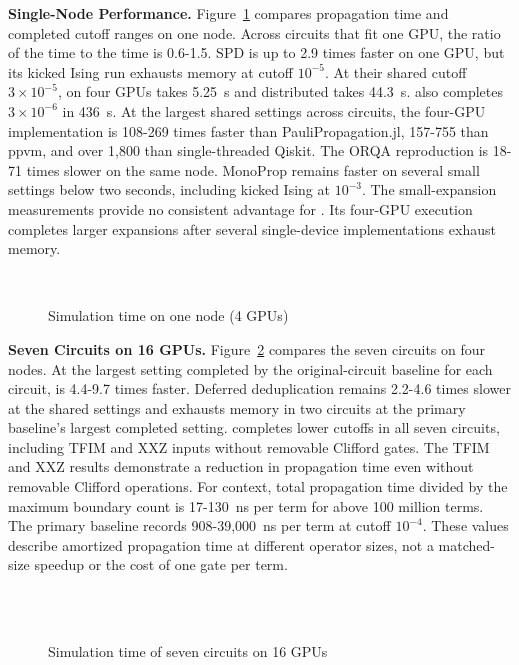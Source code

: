 \noindent\textbf{Single-Node Performance.}
Figure~\ref{fig:single} compares propagation time and completed cutoff ranges on one node.
Across circuits that fit one GPU, the ratio of the \cuPP time to the \SectorQ time is 0.6-1.5.
SPD is up to 2.9 times faster on one GPU, but its kicked Ising run exhausts memory at cutoff $10^{-5}$.
At their shared cutoff $3\times10^{-5}$, \SectorQ on four GPUs takes 5.25~s and distributed \cuPP takes 44.3~s.
\SectorQ also completes $3\times10^{-6}$ in 436~s.
At the largest shared settings across circuits, the four-GPU implementation is 108-269 times faster than PauliPropagation.jl, 157-755 than ppvm, and over 1,800 than single-threaded Qiskit.
The ORQA reproduction is 18-71 times slower on the same node.
MonoProp remains faster on several small settings below two seconds, including kicked Ising at $10^{-3}$.
The small-expansion measurements provide no consistent advantage for \SectorQ.
Its four-GPU execution completes larger expansions after several single-device implementations exhaust memory.

\begin{figure}[t]
\centering
{}\\[-2pt]
\caption{Simulation time on one node (4 GPUs)}
\label{fig:single}
\end{figure}

\noindent\textbf{Seven Circuits on 16 GPUs.}
Figure~\ref{fig:circuits} compares the seven circuits on four nodes.
At the largest setting completed by the original-circuit \cuPP baseline for each circuit, \SectorQ is 4.4-9.7 times faster.
Deferred deduplication remains 2.2-4.6 times slower at the shared settings and exhausts memory in two circuits at the primary baseline's largest completed setting.
\SectorQ completes lower cutoffs in all seven circuits, including TFIM and XXZ inputs without removable Clifford gates.
The TFIM and XXZ results demonstrate a reduction in propagation time even without removable Clifford operations.
For context, total propagation time divided by the maximum boundary count is 17-130~ns per term for \SectorQ above 100 million terms.
The primary baseline records 908-39,000~ns per term at cutoff $10^{-4}$.
These values describe amortized propagation time at different operator sizes, not a matched-size speedup or the cost of one gate per term.

\begin{figure}[t]
\centering
{}\\[-2pt]
\hfill
{}\hfill
{}\hfill
{}\\
\hfill
{}\hfill
{}
\caption{Simulation time of seven circuits on 16 GPUs}
\label{fig:circuits}
\end{figure}

